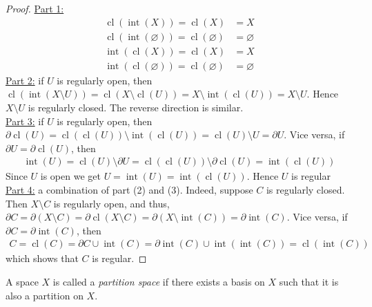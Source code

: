 \documentclass{treatise}
\begin{document}
\begin{proof}
\underline{Part 1:}
\begin{align*}
    \operatorname{cl}(\operatorname{int}(X)) = \operatorname{cl}(X) & = X
    \\
    \operatorname{cl}(\operatorname{int}(\varnothing)) = \operatorname{cl}(\varnothing) & = \varnothing
    \\
    \operatorname{int}(\operatorname{cl}(X)) = \operatorname{cl}(X) & = X
    \\
    \operatorname{int}(\operatorname{cl}(\varnothing)) = \operatorname{cl}(\varnothing) & = \varnothing
\end{align*}
\underline{Part 2:} if $U$ is regularly open, then $\operatorname{cl}(\operatorname{int}(X \setminus U)) = \operatorname{cl}(X \setminus \operatorname{cl}(U)) = X \setminus \operatorname{int}(\operatorname{cl}(U)) = X \setminus U$. Hence $X \setminus U$ is regularly closed. The reverse direction is similar.
\\
\underline{Part 3:} if $U$ is regularly open, then $\partial \operatorname{cl}(U) = \operatorname{cl}(\operatorname{cl}(U)) \setminus \operatorname{int}(\operatorname{cl}(U)) = \operatorname{cl}(U) \setminus U = \partial U$. Vice versa, if $\partial U = \partial \operatorname{cl}(U)$, then
\begin{align*}
    \operatorname{int}(U) = \operatorname{cl}(U) \setminus \partial U = \operatorname{cl}(\operatorname{cl}(U)) \setminus \partial \operatorname{cl}(U) = \operatorname{int}(\operatorname{cl}(U))
\end{align*}
Since $U$ is open we get $U = \operatorname{int}(U) = \operatorname{int}(\operatorname{cl}(U))$. Hence $U$ is regular
\\
\underline{Part 4:} a combination of part (2) and (3). Indeed, suppose $C$ is regularly closed. Then $X \setminus C$ is regularly open, and thus, $\partial C = \partial (X \setminus C) = \partial \operatorname{cl}(X \setminus C) = \partial (X \setminus \operatorname{int}(C)) = \partial \operatorname{int}(C)$. Vice versa, if $\partial C = \partial \operatorname{int}(C)$, then
\begin{align*}
    C = \operatorname{cl}(C) = \partial C \cup \operatorname{int}(C) = \partial \operatorname{int}(C) \cup \operatorname{int}(\operatorname{int}(C)) = \operatorname{cl}(\operatorname{int}(C))
\end{align*}
which shows that $C$ is regular.
\end{proof}
A space $X$ is called a \emph{partition space} if there exists a basis on $X$ such that it is also a partition on $X$.
\end{document}

